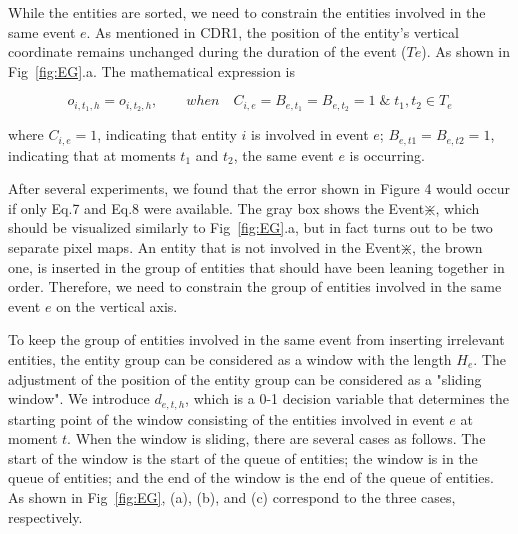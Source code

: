 While the entities are sorted, we need to constrain the entities involved in the same event $e$. As mentioned in CDR1, the position of the entity's vertical coordinate remains unchanged during the duration of the event ($Te$). As shown in Fig~\ref{fig:EG}.a. The mathematical expression is

\begin{equation}
	o_{i,t_1,h}=o_{i,t_2,h}, \quad\quad when \quad C_{i,e}=B_{e,t_1}=B_{e,t_2}=1 \;\&\; t_1,t_2 \in T_e
\end{equation}

\noindent where $C_{i,e}=1$, indicating that entity $i$ is involved in event $e$; $B_{e,t1}=B_{e,t2}=1$, indicating that at moments $t_1$ and $t_2$, the same event $e$ is occurring.

After several experiments, we found that the error shown in Figure 4 would occur if only Eq.7 and Eq.8 were available. The gray box shows the Event$\divideontimes$, which should be visualized similarly to Fig~\ref{fig:EG}.a, but in fact turns out to be two separate pixel maps. An entity that is not involved in the Event$\divideontimes$, the brown one, is inserted in the group of entities that should have been leaning together in order. Therefore, we need to constrain the group of entities involved in the same event $e$ on the vertical axis.

To keep the group of entities involved in the same event from inserting irrelevant entities, the entity group can be considered as a window with the length $H_e$. The adjustment of the position of the entity group can be considered as a "sliding window". We introduce $d_{e,t,h}$, which is a 0-1 decision variable that determines the starting point of the window consisting of the entities involved in event $e$ at moment $t$. When the window is sliding, there are several cases as follows. The start of the window is the start of the queue of entities; the window is in the queue of entities; and the end of the window is the end of the queue of entities. As shown in Fig~\ref{fig:EG}, (a), (b), and (c) correspond to the three cases, respectively.


